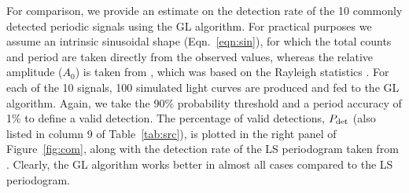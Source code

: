 \documentclass[fleqn,usenatbib]{mnras}
\begin{document}
For comparison, we provide an estimate on the detection rate of the 10 commonly detected periodic signals using the GL algorithm. For practical purposes we assume an intrinsic sinusoidal shape (Eqn.~\ref{eqn:sin}), for which the total counts and period are taken directly from the observed values, whereas the relative amplitude ($A_0$) is taken 
from \citet{2012ApJ...746..165H}, which was  based on the Rayleigh statistics \citep{1983A&A...128..245B,2003ApJ...599..465M}. 
For each of the 10 signals, 100 simulated light curves are produced and fed to the GL algorithm.
Again, we take the 90\% probability threshold and a period accuracy of 1\% to define a valid detection. The percentage of valid detections, $P_{\rm det}$ (also listed in column 9 of Table~\ref{tab:src}), is plotted in the right panel of Figure~\ref{fig:com}, along with the detection rate of the LS periodogram taken from \citet{2012ApJ...746..165H}.
Clearly, the GL algorithm works better in almost all cases compared to the LS periodogram. 
\end{document}

